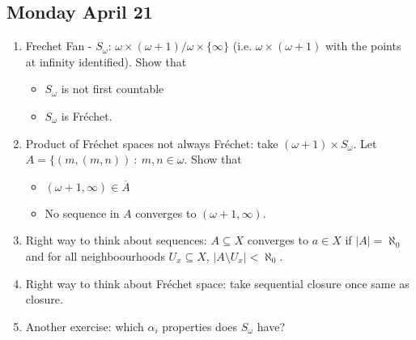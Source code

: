 \documentclass{article}
\begin{document}
\subsection*{Monday April 21} 
\begin{enumerate}
    \item Frechet Fan - \(S_{\omega}\): \(\omega \times (\omega + 1) / \omega \times \{\infty\}\) (i.e. \(\omega \times ( \omega + 1)\) with the points at infinity identified). Show that 
    \begin{itemize}
        \item \(S_{\omega}\) is not first countable \checkmark
        \item \(S_{\omega}\) is Fréchet. \checkmark
    \end{itemize}

    \item Product of Fréchet spaces not always Fréchet: take \((\omega + 1) \times S_{\omega}\). Let \(A = \{(m, (m, n)) \: : \: m,n \in \omega\). Show that 
    \begin{itemize}
        \item \((\omega + 1, \infty) \in \overline{A}\)
        \item No sequence in \(A\) converges to \((\omega + 1, \infty)\).
    \end{itemize}

    \item Right way to think about sequences: \(A \subseteq X\) converges to \(a \in X\) if \(|A| = \aleph_0\) and for all neighboourhoods \(U_x \subseteq X\), \(|A \setminus U_x| < \aleph_0\).
    
    \item Right way to think about Fréchet space: take sequential closure once same as closure.
    \item Another exercise: which \(\alpha_i\) properties does \(S_{\omega}\) have?
\end{enumerate}
\end{document}
